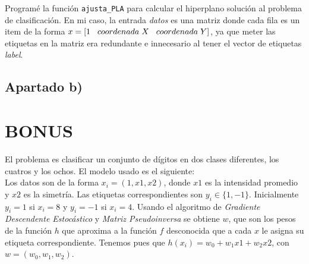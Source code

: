 \documentclass{article}
\begin{document}
Programé la función \texttt{ajusta\_PLA} para calcular el hiperplano solución al problema de clasificación. En mi caso, la entrada \textit{datos} es una matriz donde cada fila es un item de la forma $x = [1 \hspace{3mm} coordenada\hspace{1mm}X \hspace{3mm} coordenada\hspace{1mm}Y]$, ya que meter las etiquetas en la matriz era redundante e innecesario al tener el vector de etiquetas \textit{label}.

\subsection{Apartado b)}

\section{BONUS}

El problema es clasificar un conjunto de dígitos en dos clases diferentes, los cuatros y los ochos.
El modelo usado es el siguiente:\\
Los datos son de la forma $x_i = (1, x1, x2)$, donde $x1$ es la intensidad promedio y $x2$ es la simetría. Las etiquetas correspondientes son $y_i \in \{1, -1\}$. Inicialmente $y_i = 1$ si $x_i = 8$ y $y_i = -1$ si $x_i = 4$.
Usando el algoritmo de \textit{Gradiente Descendente Estocástico} y \textit{Matriz Pseudoinversa} se obtiene $w$, que son los pesos de la función $h$ que aproxima a la función $f$ desconocida que a cada $x$ le asigna su etiqueta correspondiente. Tenemos pues que $h(x_i) = w_0 + w_1x1 + w_2x2$, con $w = (w_0, w_1, w_2)$.\\
\end{document}
